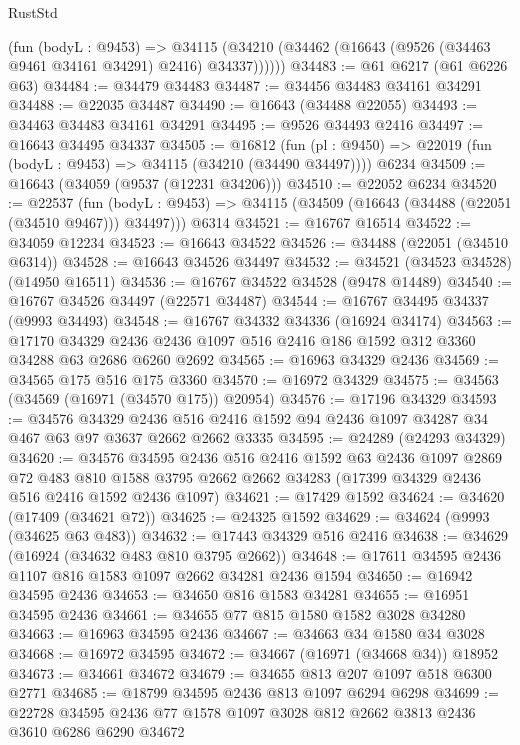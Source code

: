 \begin{lexlean}{RustStd}
\begin{coremodule}
        (fun (bodyL : @9453) =>
        @34115 (@34210 (@34462 (@16643 (@9526 (@34463 @9461 @34161 @34291) @2416) @34337))))))
@34483 := @61 @6217 (@61 @6226 @63)
@34484 := @34479 @34483
@34487 := @34456 @34483 @34161 @34291
@34488 := @22035 @34487
@34490 := @16643 (@34488 @22055)
@34493 := @34463 @34483 @34161 @34291
@34495 := @9526 @34493 @2416
@34497 := @16643 @34495 @34337
@34505 := @16812
    (fun (pl : @9450) => @22019 (fun (bodyL : @9453) => @34115 (@34210 (@34490 @34497))))
    @6234
@34509 := @16643 (@34059 (@9537 (@12231 @34206)))
@34510 := @22052 @6234
@34520 := @22537
    (fun (bodyL : @9453) => @34115 (@34509 (@16643 (@34488 (@22051 (@34510 @9467))) @34497)))
    @6314
@34521 := @16767 @16514
@34522 := @34059 @12234
@34523 := @16643 @34522
@34526 := @34488 (@22051 (@34510 @6314))
@34528 := @16643 @34526 @34497
@34532 := @34521 (@34523 @34528) (@14950 @16511)
@34536 := @16767 @34522 @34528 (@9478 @14489)
@34540 := @16767 @34526 @34497 (@22571 @34487)
@34544 := @16767 @34495 @34337 (@9993 @34493)
@34548 := @16767 @34332 @34336 (@16924 @34174)
@34563 := @17170
    @34329
    @2436
    @2436
    @1097
    @516
    @2416
    @186
    @1592
    @312
    @3360
    @34288
    @63
    @2686
    @6260
    @2692
@34565 := @16963 @34329 @2436
@34569 := @34565 @175 @516 @175 @3360
@34570 := @16972 @34329
@34575 := @34563 (@34569 (@16971 (@34570 @175)) @20954)
@34576 := @17196 @34329
@34593 := @34576
    @34329
    @2436
    @516
    @2416
    @1592
    @94
    @2436
    @1097
    @34287
    @34
    @467
    @63
    @97
    @3637
    @2662
    @2662
    @3335
@34595 := @24289 (@24293 @34329)
@34620 := @34576
    @34595
    @2436
    @516
    @2416
    @1592
    @63
    @2436
    @1097
    @2869
    @72
    @483
    @810
    @1588
    @3795
    @2662
    @2662
    @34283
    (@17399 @34329 @2436 @516 @2416 @1592 @2436 @1097)
@34621 := @17429 @1592
@34624 := @34620 (@17409 (@34621 @72))
@34625 := @24325 @1592
@34629 := @34624 (@9993 (@34625 @63 @483))
@34632 := @17443 @34329 @516 @2416
@34638 := @34629 (@16924 (@34632 @483 @810 @3795 @2662))
@34648 := @17611 @34595 @2436 @1107 @816 @1583 @1097 @2662 @34281 @2436 @1594
@34650 := @16942 @34595 @2436
@34653 := @34650 @816 @1583 @34281
@34655 := @16951 @34595 @2436
@34661 := @34655 @77 @815 @1580 @1582 @3028 @34280
@34663 := @16963 @34595 @2436
@34667 := @34663 @34 @1580 @34 @3028
@34668 := @16972 @34595
@34672 := @34667 (@16971 (@34668 @34)) @18952
@34673 := @34661 @34672
@34679 := @34655 @813 @207 @1097 @518 @6300 @2771
@34685 := @18799 @34595 @2436 @813 @1097 @6294 @6298
@34699 := @22728 @34595 @2436 @77 @1578 @1097 @3028 @812 @2662 @3813 @2436 @3610 @6286 @6290 @34672

\end{coremodule}
\end{lexlean}
